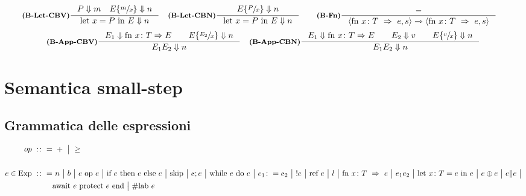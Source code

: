 \documentclass[a4paper, 10pt]{article}
\theoremstyle{definition}
\newcommand{\infer}[4]{\inference[\textbf{#1}]{#2}{#3}#4 }
\newcommand{\bbrule}[2]{ #1 \Downarrow #2}
\newcommand{\srule}[2]{\langle #1 \rangle \rightarrowtriangle \langle #2 \rangle}
\newcommand{\letin}[2]{\text{let } #1 \text{ in } #2}
\newcommand{\subs}[3]{#1 \lbrace \sfrac{#2}{#3} \rbrace}
\begin{document}
	\begin{align*}
		&\infer{(B-Let-CBV)}{\bbrule{P}{m}\quad \bbrule{\subs{E}{m}{x}}{n}}{\bbrule{\letin{x = P}{E}}{n}}{}
		&\infer{(B-Let-CBN)}{\bbrule{\subs{E}{P}{x}}{n}}{\bbrule{\letin{x = P}{E}}{n}}{} \qquad
		&\infer{(B-Fn)}{-}{\srule{\text{fn } x\colon T\ \Rightarrow\ e, s}{\text{fn } x\colon T\ \Rightarrow\ e, s}}{}
	\end{align*}
	\begin{align*}
		&\infer{(B-App-CBV)}{\bbrule{E_1}{\text{fn } x\colon T \Rightarrow E}\qquad \bbrule{\subs{E}{E_2}{x}}{n}}{\bbrule{E_1 E_2}{n}}{}
		&\infer{(B-App-CBN)}{\bbrule{E_1}{\text{fn } x\colon T \Rightarrow E}\qquad \bbrule{E_2}{v}\qquad \bbrule{\subs{E}{v}{x}}{n}}{\bbrule{E_1 E_2}{n}}{}
	\end{align*}

	\newpage
	
\section*{Semantica small-step}
\subsection*{Grammatica delle espressioni}
\begin{minipage}{.45\linewidth}
	\begin{flushleft}
	\begin{align*}
		op\ :\colon =&\ +\ \big|\ \geq \\ \\
		e\in \textup{Exp}\ :\colon =&\ n\ \big|\ b\ \big|\ e\ \textup{op}\ e\ \big|\ \textup{if}\ e\ \textup{then}\ e\ \textup{else}\ e\ \big|\ \textup{skip}\ \big|\ e;e\ \big|\ \textup{while}\ e\ \textup{do}\ e\ \big|\ e_1 \colon = e_2\ \big|\ !e\ \big|\ \text{ref } e\ \big|\ l\ \big|\
		 \text{fn } x\colon T\ \Rightarrow\ e\ \big|\ e_1 e_2\ \big|\  \text{let } x\colon T = e\ \textup{in } e\ \big|\ e\oplus e\ \big|\ e\| e\ \big|\\ 
		 &\textup{await}\ e\ \textup{protect}\ e\ \textup{end}\ \big| \ \# \text{lab } e
	\end{align*}
	\end{flushleft}
\end{minipage}
\end{document}
